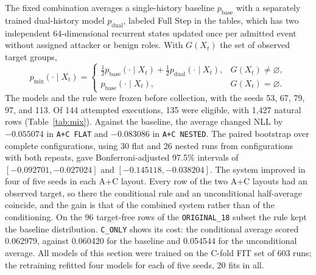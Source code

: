 The fixed combination averages a single-history baseline
$p_{\mathrm{base}}$ with a separately trained dual-history model
$p_{\mathrm{dual}}$, labeled Full Step in the tables, which has two
independent 64-dimensional recurrent states updated once per admitted
event without assigned attacker or benign roles. With $G(X_t)$ the set
of observed target groups,
\begin{equation}
  p_{\mathrm{mix}}(\cdot\mid X_t)=
  \begin{cases}
    \tfrac12 p_{\mathrm{base}}(\cdot\mid X_t)
      + \tfrac12 p_{\mathrm{dual}}(\cdot\mid X_t), & G(X_t)\ne\varnothing,\\
    p_{\mathrm{base}}(\cdot\mid X_t), & G(X_t)=\varnothing .
  \end{cases}
  \label{eq:mixture}
\end{equation}
The models and the rule were frozen before collection, with the seeds
53, 67, 79, 97, and 113. Of 144 attempted executions, 135 were eligible,
with 1,427 natural rows (Table~\ref{tab:mix}). Against the baseline,
the average changed NLL by $-0.055074$ in \texttt{A+C FLAT} and
$-0.083086$ in \texttt{A+C NESTED}. The paired bootstrap over complete
configurations, using 30 flat and 26 nested runs from configurations
with both repeats, gave Bonferroni-adjusted 97.5\% intervals of
$[-0.092701,-0.027024]$ and $[-0.145118,-0.038204]$. The system improved
in four of five seeds in each A+C layout. Every row of the two A+C
layouts had an observed target, so there the conditional rule and an
unconditional half-average coincide, and the gain is that of the
combined system rather than of the conditioning. On the 96 target-free
rows of the \texttt{ORIGINAL\_18} subset the rule kept the baseline
distribution. \texttt{C\_ONLY} shows its cost: the conditional average
scored 0.062979, against 0.060420 for the baseline and 0.054544 for the
unconditional average. All models of this section were trained on the
C-fold FIT set of 603 runs; the retraining refitted four models for
each of five seeds, 20 fits in all.

